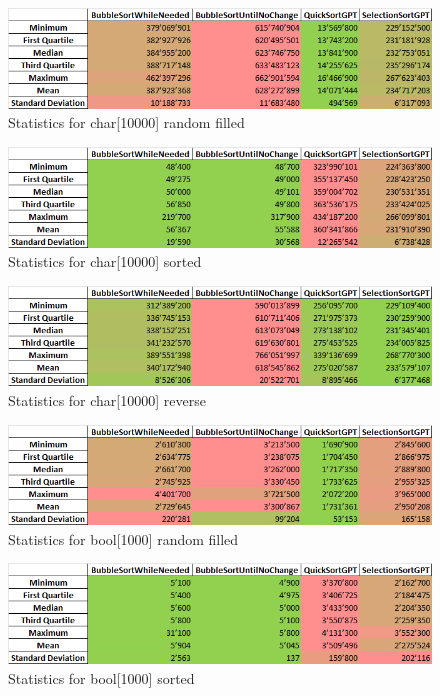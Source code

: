 \documentclass{article}
\begin{document}
    \begin{figure}[!h]
        \centering
        \includegraphics[width=0.75\linewidth]{char10000rand-stat.png}
        \caption{Statistics for char[10000] random filled}
        \label{fig:char10000rand-stat}
    \end{figure}
    \begin{figure}[!h]
        \centering
        \includegraphics[width=0.75\linewidth]{char10000sort-stat.png}
        \caption{Statistics for char[10000] sorted}
        \label{fig:char10000sort-stat}
    \end{figure}
    \begin{figure}[!h]
        \centering
        \includegraphics[width=0.75\linewidth]{char10000rev-stat.png}
        \caption{Statistics for char[10000] reverse}
        \label{fig:char10000rev-stat}
    \end{figure}
    \begin{figure}[!h]
        \centering
        \includegraphics[width=0.75\linewidth]{bool1000rand-stat.png}
        \caption{Statistics for bool[1000] random filled}
        \label{fig:bool1000rand-stat}
    \end{figure}
    \begin{figure}[!h]
        \centering
        \includegraphics[width=0.75\linewidth]{bool1000sort-stat.png}
        \caption{Statistics for bool[1000] sorted}
        \label{fig:bool1000sort-stat}
    \end{figure}
\end{document}
